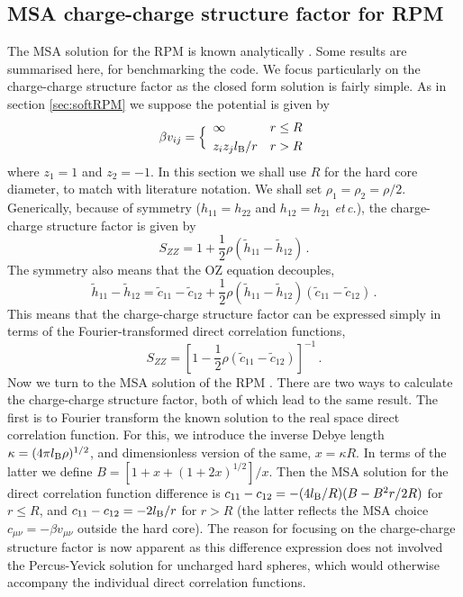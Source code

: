 \documentclass[12pt,a4paper]{article}
\newcommand{\latin}[1]{\emph{#1}}
\newcommand{\etc}{\latin{et\,c.}}
\begin{document}
\subsection{MSA charge-charge structure factor for RPM}
%
The MSA solution for the RPM is known analytically \cite{WL72}.  Some
results are summarised here, for benchmarking the code.  We
focus particularly on the charge-charge structure factor as the closed
form solution is fairly simple.  As in section \ref{sec:softRPM} we
suppose the potential is given by
%
\begin{equation}
  \beta v_{ij}=\Bigl\{\begin{array}{ll}
  \infty & r\le R\\[3pt]
  z_iz_jl_{\mathrm{B}}/r & r>R
  \end{array}
\end{equation}
%
where $z_1=1$ and $z_2=-1$. In this section we shall use $R$ for the
hard core diameter, to match with literature notation.  We shall set
$\rho_1=\rho_2=\rho/2$.  Generically, because of symmetry
($h_{11}=h_{22}$ and $h_{12}=h_{21}$ \etc), the charge-charge
structure factor is given by
%
\begin{equation}
  S_{ZZ}=1+{\textstyle\frac{1}{2}}\rho(\tilde h_{11}-\tilde h_{12})\,.
\end{equation}
%
The symmetry also means that the OZ equation decouples,
%
\begin{equation}
  \tilde h_{11}-\tilde h_{12}=
  \tilde c_{11}-\tilde c_{12} + 
  {\textstyle\frac{1}{2}}\rho(\tilde h_{11}-\tilde h_{12})
  (\tilde c_{11}-\tilde c_{12})\,.
\end{equation}
%
This means that the charge-charge structure factor can be expressed
simply in terms of the Fourier-transformed direct correlation functions,
%
\begin{equation}
  S_{ZZ}=[1-{\textstyle\frac{1}{2}}\rho(\tilde c_{11}-\tilde c_{12})]^{-1}\,.
\end{equation}
%
Now we turn to the MSA solution of the RPM \cite{WL72}.  There are two
ways to calculate the charge-charge structure factor, both of which
lead to the same result.  The first is to Fourier transform the known
solution to the real space direct correlation function.  For this, we
introduce the inverse Debye length $\kappa=(4\pi l_{\mathrm{B}}\rho)^{1/2}$, and
dimensionless version of the same, $x=\kappa R$.  In terms of the
latter we define $B=[1+x+(1+2x)^{1/2}]/x$.  Then the MSA solution for
the direct correlation function difference is
$c_{11}-c_{12}=-({4l_{\mathrm{B}}}/{R})(B-{B^2 r}/{2R})$ for $r\le R$, and
$c_{11}-c_{12}= -{2l_{\mathrm{B}}}/{r}$ for $r > R$ (the latter reflects the MSA
choice $c_{\mu\nu}=-\beta v_{\mu\nu}$ outside the hard core).  The
reason for focusing on the charge-charge structure factor is now
apparent as this difference expression does not involved the
Percus-Yevick solution for uncharged hard spheres, which would
otherwise accompany the individual direct correlation functions.
\end{document}
